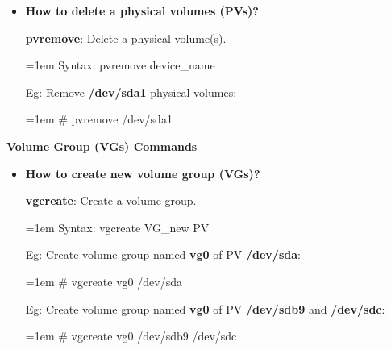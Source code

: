 \begin{flushleft}
\begin{itemize}
		\bigskip
		\bigskip
		\item  \textbf{How to delete a physical volumes (PVs)?}
		
		\textbf{pvremove}: Delete a physical volume(s).
		\begin{tcolorbox}[breakable,notitle,boxrule=-0pt,colback=pink,colframe=pink]
			\color{black}
			\font=1em
			Syntax: pvremove device\_name
			\font=4pt
		\end{tcolorbox}
		
		Eg: Remove \textbf{/dev/sda1} physical volumes:
		\begin{tcolorbox}[breakable,notitle,boxrule=-0pt,colback=black,colframe=black]
			\color{green}
			\font=1em
			\# pvremove /dev/sda1
			\font=4pt
		\end{tcolorbox}
		
	\end{itemize}
	
	\newpage
	
	\textbf{Volume Group (VGs) Commands}
	
	\begin{itemize}
		\item \textbf{How to create new volume group (VGs)?}
			
			\textbf{vgcreate}: Create a volume group.
			\begin{tcolorbox}[breakable,notitle,boxrule=-0pt,colback=pink,colframe=pink]
				\color{black}
				\font=1em
				Syntax: vgcreate VG\_new PV
				\font=4pt
			\end{tcolorbox}
			
					
			Eg: Create volume group named \textbf{vg0} of PV \textbf{/dev/sda}:
			\begin{tcolorbox}[breakable,notitle,boxrule=-0pt,colback=black,colframe=black]
				\color{green}
				\font=1em
				\# vgcreate vg0 /dev/sda
				\font=4pt
			\end{tcolorbox}
			
			Eg: Create volume group named \textbf{vg0} of PV \textbf{/dev/sdb9} and \textbf{/dev/sdc}:
			\begin{tcolorbox}[breakable,notitle,boxrule=-0pt,colback=black,colframe=black]
				\color{green}
				\font=1em
				\# vgcreate vg0 /dev/sdb9 /dev/sdc
				\font=4pt
			\end{tcolorbox}
			
	\end{itemize}


\end{flushleft}
